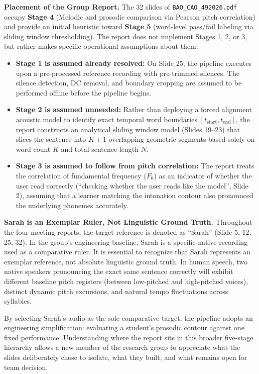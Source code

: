 \documentclass[11pt,a4paper]{article}
\begin{document}
\textbf{Placement of the Group Report.} The 32 slides of \texttt{BAO\_CAO\_492026.pdf} occupy \textbf{Stage 4} (Melodic and prosodic comparison via Pearson pitch correlation) and provide an initial heuristic toward \textbf{Stage 5} (word-level pass/fail labeling via sliding window thresholding). The report does not implement Stages 1, 2, or 3, but rather makes specific operational assumptions about them:
\begin{itemize}
    \item \textbf{Stage 1 is assumed already resolved:} On Slide 25, the pipeline executes upon a pre-processed reference recording with pre-trimmed silences. The silence detection, DC removal, and boundary cropping are assumed to be performed offline before the pipeline begins.
    \item \textbf{Stage 2 is assumed unneeded:} Rather than deploying a forced alignment acoustic model to identify exact temporal word boundaries $[t_{\text{start}}, t_{\text{end}}]$, the report constructs an analytical sliding window model (Slides 19--23) that slices the sentence into $K+1$ overlapping geometric segments based solely on word count $K$ and total sentence length $N$.
    \item \textbf{Stage 3 is assumed to follow from pitch correlation:} The report treats the correlation of fundamental frequency ($F_0$) as an indicator of whether the user read correctly (``checking whether the user reads like the model'', Slide 2), assuming that a learner matching the intonation contour also pronounced the underlying phonemes accurately.
\end{itemize}

\textbf{Sarah is an Exemplar Ruler, Not Linguistic Ground Truth.} Throughout the four meeting reports, the target reference is denoted as ``Sarah'' (Slide 5, 12, 25, 32). In the group's engineering baseline, Sarah is a specific native recording used as a comparative ruler. It is essential to recognize that Sarah represents an exemplar reference, not absolute linguistic ground truth. In human speech, two native speakers pronouncing the exact same sentence correctly will exhibit different baseline pitch registers (between low-pitched and high-pitched voices), distinct dynamic pitch excursions, and natural tempo fluctuations across syllables. 

By selecting Sarah's audio as the sole comparative target, the pipeline adopts an engineering simplification: evaluating a student's prosodic contour against one fixed performance. Understanding where the report sits in this broader five-stage hierarchy allows a new member of the research group to appreciate what the slides deliberately chose to isolate, what they built, and what remains open for team decision.
\end{document}
